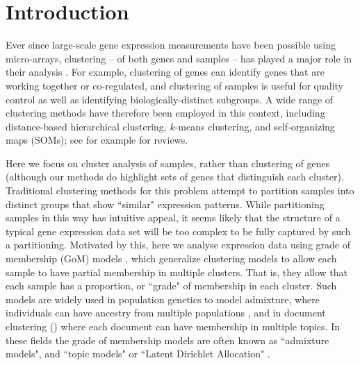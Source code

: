 \section{Introduction}

Ever since large-scale gene expression measurements have been possible using micro-arrays, clustering -- of both genes and samples -- 
has played a major role in their analysis \cite{Eisen1998}\cite{Golub1999} \cite{Alizadeh2000}.
For example, clustering of genes can identify genes that are working together or co-regulated, and clustering of samples is useful for quality control 
as well as identifying biologically-distinct subgroups. A wide range of clustering methods have therefore
been employed in this context, including distance-based hierarchical clustering, $k$-means clustering, and self-organizing maps (SOMs); see for example \cite{D'haeseleer2005} \cite{Jiang2004} for reviews. 

Here we focus on cluster analysis of samples, rather than clustering of genes (although our methods do highlight sets of genes that distinguish each cluster). 
Traditional clustering methods for this problem attempt to partition samples into distinct groups that show ``similar" expression patterns. 
While partitioning samples in this way has intuitive appeal, 
it seems likely that the structure of a typical gene expression data set will be too complex to be fully captured by such a partitioning. 
Motivated by this, here we analyse expression data using grade of membership (GoM) models \cite{Erosheva2006}, which generalize clustering models 
to allow each sample to have partial membership in multiple clusters.
That is, they allow that each sample has a proportion, or ``grade" of membership in each cluster. Such
models are widely used in population genetics to model admixture, where individuals can have ancestry from multiple populations \cite{Pritchard2000},
and in document clustering (\cite{Blei2003,Blei2009}) where each document can have membership in multiple topics. In these fields
the grade of membership models are often known as ``admixture models", and ``topic models" or ``Latent Dirichlet Allocation" \cite{Blei2003}.



